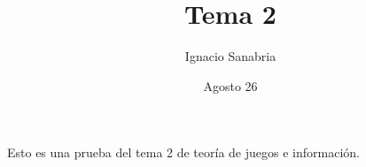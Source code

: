 \documentclass[12pt]{article}
\title{Tema 2}
\author{Ignacio Sanabria}
\date{Agosto 26}
\begin{document}
\maketitle
Esto es una prueba del tema 2 de teoría de juegos e información. \\\\
\end{document}
